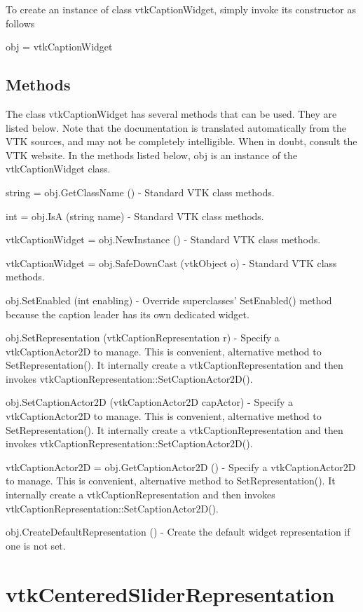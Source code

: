 To create an instance of class vtk\-Caption\-Widget, simply invoke its constructor as follows \begin{DoxyVerb}  obj = vtkCaptionWidget
\end{DoxyVerb}
 \hypertarget{vtkwidgets_vtkxyplotwidget_Methods}{}\subsection{Methods}\label{vtkwidgets_vtkxyplotwidget_Methods}
The class vtk\-Caption\-Widget has several methods that can be used. They are listed below. Note that the documentation is translated automatically from the V\-T\-K sources, and may not be completely intelligible. When in doubt, consult the V\-T\-K website. In the methods listed below, {\ttfamily obj} is an instance of the vtk\-Caption\-Widget class. 
\begin{DoxyItemize}
\item {\ttfamily string = obj.\-Get\-Class\-Name ()} -\/ Standard V\-T\-K class methods.  
\item {\ttfamily int = obj.\-Is\-A (string name)} -\/ Standard V\-T\-K class methods.  
\item {\ttfamily vtk\-Caption\-Widget = obj.\-New\-Instance ()} -\/ Standard V\-T\-K class methods.  
\item {\ttfamily vtk\-Caption\-Widget = obj.\-Safe\-Down\-Cast (vtk\-Object o)} -\/ Standard V\-T\-K class methods.  
\item {\ttfamily obj.\-Set\-Enabled (int enabling)} -\/ Override superclasses' Set\-Enabled() method because the caption leader has its own dedicated widget.  
\item {\ttfamily obj.\-Set\-Representation (vtk\-Caption\-Representation r)} -\/ Specify a vtk\-Caption\-Actor2\-D to manage. This is convenient, alternative method to Set\-Representation(). It internally create a vtk\-Caption\-Representation and then invokes vtk\-Caption\-Representation\-::\-Set\-Caption\-Actor2\-D().  
\item {\ttfamily obj.\-Set\-Caption\-Actor2\-D (vtk\-Caption\-Actor2\-D cap\-Actor)} -\/ Specify a vtk\-Caption\-Actor2\-D to manage. This is convenient, alternative method to Set\-Representation(). It internally create a vtk\-Caption\-Representation and then invokes vtk\-Caption\-Representation\-::\-Set\-Caption\-Actor2\-D().  
\item {\ttfamily vtk\-Caption\-Actor2\-D = obj.\-Get\-Caption\-Actor2\-D ()} -\/ Specify a vtk\-Caption\-Actor2\-D to manage. This is convenient, alternative method to Set\-Representation(). It internally create a vtk\-Caption\-Representation and then invokes vtk\-Caption\-Representation\-::\-Set\-Caption\-Actor2\-D().  
\item {\ttfamily obj.\-Create\-Default\-Representation ()} -\/ Create the default widget representation if one is not set.  
\end{DoxyItemize}\hypertarget{vtkwidgets_vtkcenteredsliderrepresentation}{}\section{vtk\-Centered\-Slider\-Representation}\label{vtkwidgets_vtkcenteredsliderrepresentation}
